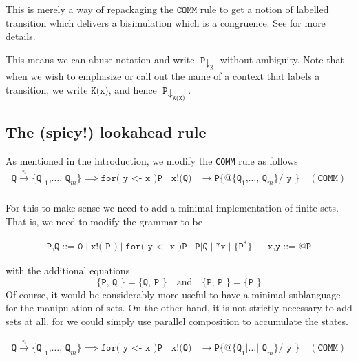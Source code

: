 \documentclass{article}
\newcommand{\code}[1]{\texttt{#1}}
\newcommand{\tcode}[1]{\texttt{#1}}
\begin{document}
This is merely a way of repackaging the $\code{COMM}$ rule to get a notion of labelled transition which delivers a bisimulation which is a congruence. See \cite{Wells2025} for more details.

This means we can abuse notation and write $\code{P}\downarrow_{\code{K}}$ without ambiguity. Note that when we wish to emphasize or call out the name of a context that labels a transition, we write $\code{K(x)}$, and hence $\code{P}\downarrow_{\code{K(x)}}$.

\subsection{The (spicy!) lookahead rule}

As mentioned in the introduction, we modify the \code{COMM} rule as follows
\begin{align*}
  \code{Q} \xrightarrow{n} \code{\{ Q }_1 \code{,} \ldots \code{, Q}_m \code{\}} \implies \code{for( y <- x )P | x!(Q)} &\rightarrow \code{P\{ @\{ Q}_1 \code{,} \ldots \code{, Q}_m \code{\} / y \}} \quad (\tcode{COMM}) \\
\end{align*}

For this to make sense we need to add a minimal implementation of finite sets. That is, we need to modify the grammar to be

\begin{align*}
  \code{P,Q} \;\code{::=}\; \code{0} \mid \code{x!( P )} \mid \code{for( y <- x )P} \mid \code{P|Q} \mid \code{*x} \mid \code{\{} \code{P}^{*} \code{\}} & & \code{x,y} \;\code{::=}\; \code{@P}
\end{align*}

with the additional equations
\[
  \code{\{ P, Q \}} = \code{\{ Q, P \}} \quad \text{and} \quad \code{\{ P, P \}} = \code{\{ P \}}
\]
Of course, it would be considerably more useful to have a minimal sublanguage for the manipulation of sets. On the other hand, it is not strictly necessary to add sets at all, for we could simply use parallel composition to accumulate the states.

\begin{align*}
  \code{Q} \xrightarrow{n} \code{\{ Q }_1 \code{,} \ldots \code{, Q}_m \code{\}} \implies \code{for( y <- x )P | x!(Q)} &\rightarrow \code{P\{ @\{ Q}_1 \code{|} \ldots \code{| Q}_m \code{\} / y \}} \quad (\tcode{COMM}) \\
\end{align*}
\end{document}
